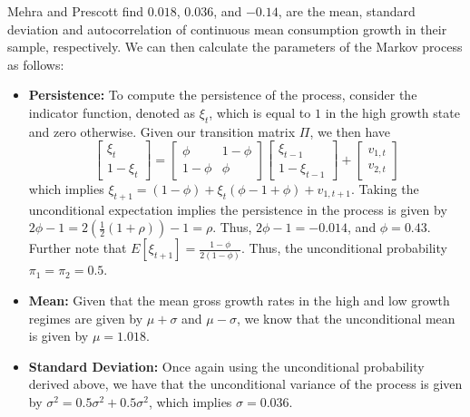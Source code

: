 \documentclass[french]{article}
\begin{document}
Mehra and Prescott find $0.018$, $0.036$, and $-0.14$, are the mean, standard deviation and autocorrelation of continuous mean consumption growth in their sample, respectively. We can then calculate the parameters of the Markov process as follows:
\begin{itemize}
	\item \textbf{Persistence:} To compute the persistence of the process, consider the indicator function, denoted as  $\xi_t$, which is equal to $1$ in the high growth state and zero otherwise.  Given our transition matrix $\Pi$, we then have 
	\begin{equation*}
	\begin{bmatrix}
	\xi_{t}\\ 1- \xi_t
	\end{bmatrix} = \begin{bmatrix} 
	\phi & 1-\phi\\1-\phi & \phi
	\end{bmatrix} \begin{bmatrix}
	\xi_{t-1}\\ 1- \xi_{t-1}
	\end{bmatrix}
	+
	\begin{bmatrix}
	v_{1, t}\\ v_{2, t}
	\end{bmatrix}
	\end{equation*}
	which implies $\xi_{t+1} = (1-\phi) + \xi_t(\phi -1 +\phi) + v_{1, t+1}$. Taking the unconditional expectation implies the persistence in the process is given by $2\phi -1 = 2(\frac{1}{2}(1+\rho))-1 = \rho$. Thus, $2\phi -1 = -0.014$, and $\phi = 0.43$. Further note that $E\left[\xi_{t+1}\right] = \frac{1-\phi}{2(1-\phi)}$. Thus, the unconditional probability $\pi_1 = \pi_2 = 0.5$. 
	\item\textbf{Mean:} Given that the mean gross growth rates in the high and low growth regimes are given by $\mu + \sigma$ and $\mu -\sigma$, we know that the unconditional mean is given by $\mu = 1.018$.
	\item \textbf{Standard Deviation:} Once again using the unconditional probability derived above, we have that the unconditional variance of the process is given by	$\sigma^2 = 0.5 \sigma^2 + 0.5\sigma^2$, which implies $\sigma = 0.036$. 
\end{itemize}



\end{document}
